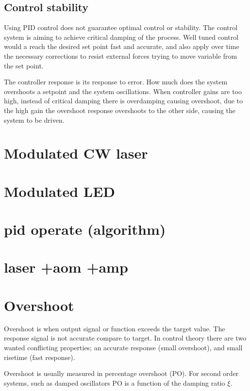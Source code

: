 \documentclass[\main/master.tex]{subfiles}
\begin{document}
\subsection{Control stability}
Using PID control does not guarantee optimal control or stability. The control system is aiming to achieve critical damping of the process. Well tuned control would a reach the desired set point fast and accurate, and also apply over time the necessary corrections to resist external forces trying to move variable from the set point.
\par\noindent
The controller response is its response to error. How much does the system overshoots a setpoint and the system oscillations. When controller gains are too high, instead of critical damping there is overdamping causing overshoot, due to the high gain the overshoot response overshoots to the other side, causing the system to be driven.










\section{Modulated CW laser}


\section{Modulated LED}

















\section{pid operate (algorithm)}
\section{laser +aom +amp}
\doublespacing



\section{Overshoot}
Overshoot is when output signal or function exceeds the target value. The response signal is not accurate compare to target. In control theory there are two wanted conflicting properties; an accurate response (small overshoot), and small risetime (fast response). 
\par\noindent
Overshoot is usually measured in percentage overshoot (PO). For second order systems, such as damped oscillators PO is a function of the damping ratio $\xi$. 
\end{document}
